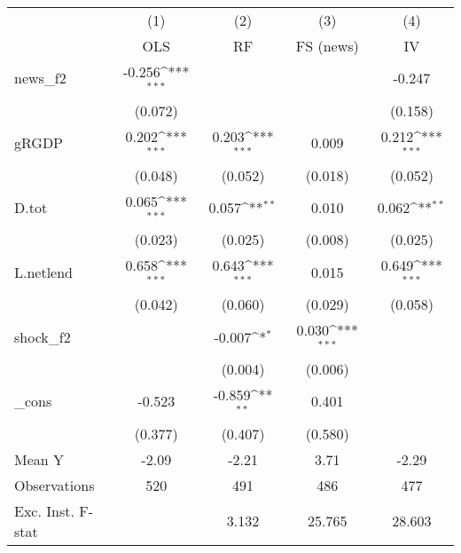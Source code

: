 {
\def\sym#1{\ifmmode^{#1}\else\(^{#1}\)\fi}
\begin{tabular}{l*{4}{c}}
\toprule
            &\multicolumn{1}{c}{(1)}&\multicolumn{1}{c}{(2)}&\multicolumn{1}{c}{(3)}&\multicolumn{1}{c}{(4)}\\
            &\multicolumn{1}{c}{OLS}&\multicolumn{1}{c}{RF}&\multicolumn{1}{c}{FS (news)}&\multicolumn{1}{c}{IV}\\
\midrule
news\_f2     &      -0.256\sym{***}&                     &                     &      -0.247         \\
            &     (0.072)         &                     &                     &     (0.158)         \\
\addlinespace
gRGDP       &       0.202\sym{***}&       0.203\sym{***}&       0.009         &       0.212\sym{***}\\
            &     (0.048)         &     (0.052)         &     (0.018)         &     (0.052)         \\
\addlinespace
D.tot       &       0.065\sym{***}&       0.057\sym{**} &       0.010         &       0.062\sym{**} \\
            &     (0.023)         &     (0.025)         &     (0.008)         &     (0.025)         \\
\addlinespace
L.netlend   &       0.658\sym{***}&       0.643\sym{***}&       0.015         &       0.649\sym{***}\\
            &     (0.042)         &     (0.060)         &     (0.029)         &     (0.058)         \\
\addlinespace
shock\_f2    &                     &      -0.007\sym{*}  &       0.030\sym{***}&                     \\
            &                     &     (0.004)         &     (0.006)         &                     \\
\addlinespace
\_cons      &      -0.523         &      -0.859\sym{**} &       0.401         &                     \\
            &     (0.377)         &     (0.407)         &     (0.580)         &                     \\
\midrule
Mean Y      &       -2.09         &       -2.21         &        3.71         &       -2.29         \\
Observations&         520         &         491         &         486         &         477         \\
Exc. Inst. F-stat&                     &       3.132         &      25.765         &      28.603         \\
\bottomrule
\end{tabular}
}
